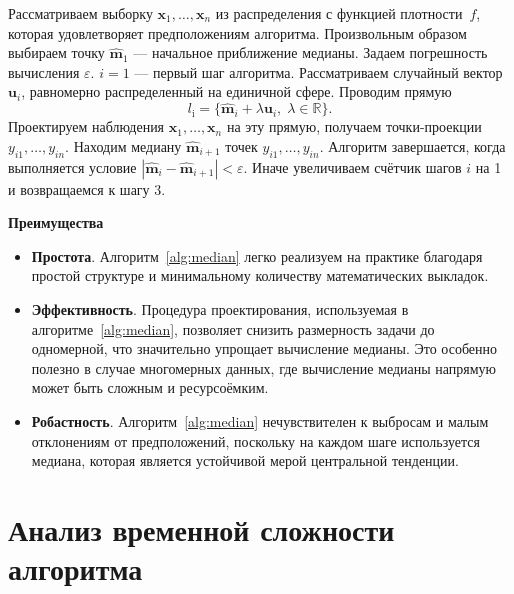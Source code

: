 \documentclass[specialist,
substylefile = spbu.rtx,
               subf,href,colorlinks=true, 12pt]{disser}
\begin{document}
\begin{algorithm}[H]
\caption{Вычисление оценки некоторого обобщения многомерной медианы}
\begin{algorithmic}[1]
			\State Рассматриваем выборку $\mathbf{x}_1,\ldots,\mathbf{x}_{{n}}$ из распределения с функцией плотности~$f$, которая удовлетворяет предположениям алгоритма. 
			\State Произвольным образом выбираем точку $\widehat{\mathbf{m}}_1$ --- начальное приближение медианы. Задаем погрешность вычисления $\varepsilon$. $i=1$ --- первый шаг алгоритма. 
			\State Рассматриваем случайный вектор $\mathbf{u}_i$, равномерно распределенный на единичной сфере. Проводим прямую 
			\[l_{\text{i}}=\{\widehat{\mathbf{m}}_{{i}}+\lambda\mathbf{u}_{{i}},\;\lambda\in\mathbb{R}\}.\]
			\State Проектируем наблюдения $\mathbf{x}_1,\ldots,\mathbf{x}_{{n}}$ на эту прямую, получаем точки-проекции~$y_{i1},\ldots,y_{in}$.
			\State Находим медиану $\widehat{\mathbf{m}}_{{i+1}}$ точек $y_{{i1}},\ldots,y_{{in}}$. 
			\State Алгоритм завершается, когда выполняется условие $|\widehat{\mathbf{m}}_{{i}}-\widehat{\mathbf{m}}_{{i+1}}|<\varepsilon$. Иначе увеличиваем счётчик шагов $i$ на 1 и возвращаемся к шагу 3.
\end{algorithmic}
\label{alg:median}
\end{algorithm}
\vspace{1ex}

\textbf{Преимущества}

\begin{itemize}
    \item \textbf{Простота}.  Алгоритм~\ref{alg:median} легко реализуем на практике благодаря простой структуре и минимальному количеству математических выкладок.

    \item \textbf{Эффективность}. Процедура проектирования, используемая в алгоритме~\ref{alg:median}, позволяет снизить размерность задачи до одномерной, что значительно упрощает вычисление медианы. Это особенно полезно в случае многомерных данных, где вычисление медианы напрямую может быть сложным и ресурсоёмким. 
    
    \item \textbf{Робастность}. Алгоритм~\ref{alg:median} нечувствителен к выбросам и малым отклонениям от предположений, поскольку на каждом шаге используется медиана, которая является устойчивой мерой центральной тенденции.
\end{itemize}

\section{Анализ временной сложности алгоритма}
\end{document}
